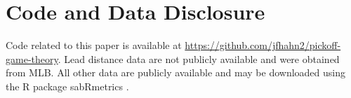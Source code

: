 \documentclass[opre,dblanonrev]{informs4}
\begin{document}
    \section{Code and Data Disclosure}

    Code related to this paper is available at \url{https://github.com/jfhahn2/pickoff-game-theory}. Lead distance data are not publicly available and were obtained from MLB. All other data are publicly available and may be downloaded using the R package sabRmetrics \citep{powers_sabrmetrics_2025}.


  
 
\end{document}
